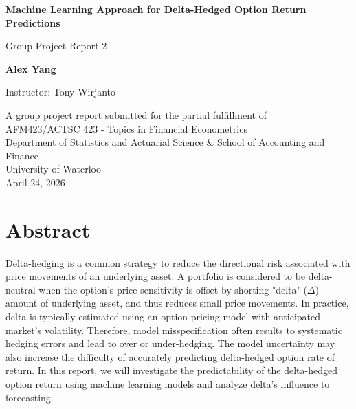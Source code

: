 \documentclass[oneside, 12pt]{article}
\newcommand*{\1}{\text{\scalebox{1.1}{\usefont{U}{bbold}{m}{n}1}}}
\begin{document}
\begin{titlepage}
    \begin{center}
        \vspace*{1cm} %
        
        {\Huge\textbf{Machine Learning Approach for Delta-Hedged Option Return Predictions}} %
        
        \vspace{0.5cm} %
        
        {\Large Group Project Report 2} %
        
        \vspace{1.5cm} %
        
        {\Large\textbf{Alex Yang}} %
        
        
        \vspace{1cm}
        {\Large Instructor: Tony Wirjanto}

        \vfill %

        A group project report submitted for the partial fulfillment of\\
        AFM423/ACTSC 423 - Topics in Financial Econometrics
        \vspace{0.8cm}
        \\[0.5cm]
        Department of Statistics and Actuarial Science \& School of Accounting and Finance\\
        University of Waterloo\\
        April 24, 2026
    \end{center}
    
\end{titlepage}

\tableofcontents

\newpage
\section{Abstract}
Delta-hedging is a common strategy to reduce the directional risk associated with price movements of an underlying asset. A portfolio is considered to be delta-neutral when the option's price sensitivity is offset by shorting "delta" ($\Delta$) amount of underlying asset, and thus reduces small price movements. In practice, delta is typically estimated using an option pricing model with anticipated market's volatility. Therefore, model misspecification often results to systematic hedging errors and lead to over or under-hedging. The model uncertainty may also increase the difficulty of accurately predicting delta-hedged option rate of return. In this report, we will investigate the predictability of the delta-hedged option return using machine learning models and analyze delta's influence to forecasting. 
\end{document}
